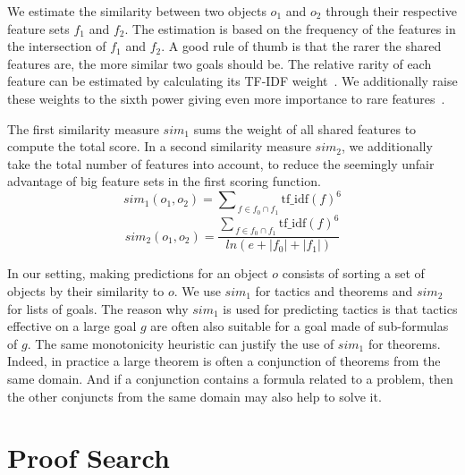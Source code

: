 \documentclass[runningheads,a4paper,draft]{svjour3}
\begin{document}
We estimate the similarity between two objects $o_1$ and $o_2$
through their respective feature sets $f_1$ and $f_2$.
The estimation is based on the frequency of the features in the intersection of
$f_1$ and $f_2$. A good rule of thumb is that the rarer the shared features
are, the more similar two goals should be. The relative rarity of each feature
can be estimated by calculating its TF-IDF weight~\cite{Jones72astatistical}.
We additionally raise these weights to the sixth power giving
even more importance
to rare features~\cite{BlanchetteGKKU16}.

The first similarity measure $\mathit{sim}_1$ sums the weight of all shared
features to compute the total score.
In a second similarity measure $\mathit{sim}_2$, we additionally take
the total number of features into account, to reduce the seemingly unfair
advantage of big
feature sets in the first scoring function.
\[\mathit{sim}_1 (o_1, o_2) = {\sum\nolimits_{\,f \in f_0 \cap
f_1}{\mathrm{tf\_idf}(f)^{6}}}\]
\[\mathit{sim}_2 (o_1, o_2) = \frac{{\sum\nolimits_{\,f \in f_0 \cap
f_1}{\mathrm{tf\_idf}(f)^{6}}}}
{ln (e + |f_0| + |f_1|)}\]

In our setting, making predictions for an object $o$ consists of sorting a set
of objects by their similarity to $o$. We use $\mathit{sim}_1$ for tactics and theorems
and $\mathit{sim}_2$ for lists of goals. The reason why $\mathit{sim}_1$ is used for
predicting tactics is that tactics effective on a large goal $g$ are often also
suitable for a goal made of sub-formulas of $g$. The same monotonicity
heuristic can justify the use of $\mathit{sim}_1$ for theorems. Indeed, in practice a
large theorem is often a conjunction of theorems from the same domain.
And if a conjunction contains a formula related to a problem, then the other
conjuncts from the same domain may also help to solve it.


\section{Proof Search}\label{sec:proofsearch}
\end{document}

